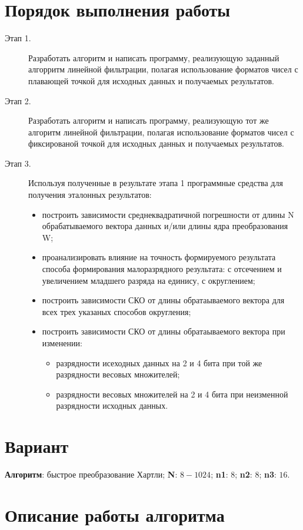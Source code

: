 \documentclass[12pt, a4paper] {ncc}
\begin{document}
\section*{Порядок выполнения работы}
	\begin{description}
		\item[Этап 1.] Разработать алгоритм и написать программу, реализующую заданный алгорритм линейной фильтрации,
			  полагая использование форматов чисел с плавающей точкой для исходных данных и получаемых результатов.
		\item[Этап 2.] Разработать алгоритм и написать программу, реализующую тот же алгоритм линейной фильтрации,
			  полагая использование форматов чисел с фиксированой точкой для исходных данных и получаемых результатов.
		\item[Этап 3.] Используя полученные в результате этапа 1 программные средства для получения
			  эталонных результатов:
			\begin{itemize}
				\item построить зависимости среднеквадратичной погрешности от длины N обрабатываемого вектора данных
					  и/или длины ядра преобразования W;
				\item проанализировать влияние на точность формируемого результата способа формирования малоразрядного
					  результата: с отсечением и увеличением младшего разряда на единису, с округлением;
				\item построить зависимости СКО от длины обратаываемого вектора для всех трех
					  указаных способов округления;
				\item построить зависимости СКО от длины обратаываемого вектора при изменении:
				\begin{itemize}
					\item разрядности исеходных данных на 2 и 4 бита при той же разрядности весовых множителей;
					\item разрядности весовых множителей на 2 и 4 бита при неизменной разрядности исходных данных.
				\end{itemize}
			\end{itemize}
	\end{description}
\section*{Вариант}

\textbf{Алгоритм}: быстрое преобразование Хартли; \textbf{N}: $8-1024$; \textbf{n1}: $8$; \textbf{n2}: $8$; \textbf{n3}: $16$.
\section*{Описание работы алгоритма}
\end{document}
